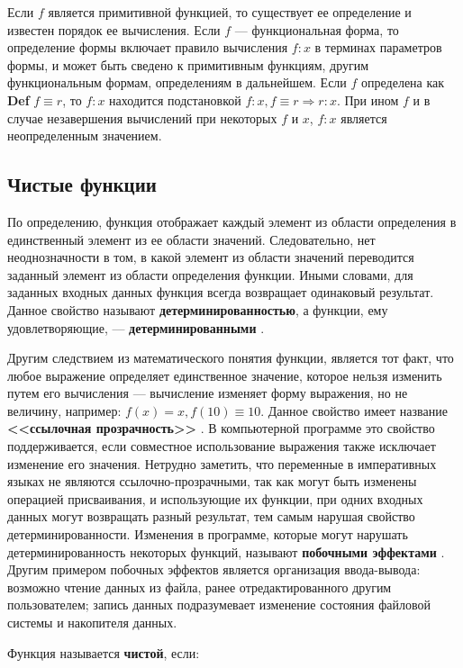 Если $f$ является примитивной функцией, то существует ее определение и известен
порядок ее вычисления. Если $f$ --- функциональная форма, то определение
формы включает правило вычисления $f:x$ в терминах параметров формы, и может
быть сведено к примитивным функциям, другим функциональным формам, определениям
в дальнейшем. Если $f$ определена как \textbf{Def} $f \equiv r$, то
$f:x$ находится подстановкой $f:x, f \equiv r \Rightarrow r:x$. При ином $f$
и в случае незавершения вычислений при некоторых $f$ и $x$, $f:x$ является
неопределенным значением.

\subsection{Чистые функции}\label{sec:ch1/sec3/subsec2}

По определению, функция отображает каждый элемент из области определения
в единственный элемент из ее области значений.
Следовательно, нет неоднозначности в том, в какой элемент
из области значений переводится заданный элемент из области
определения функции. Иными словами, для заданных входных данных
функция всегда возвращает одинаковый результат. Данное свойство
называют \textbf{детерминированностью}, а функции, ему удовлетворяющие, ---
\textbf{детерминированными} \cite[с.~12]{fp93}.

Другим следствием из математического понятия функции, является тот факт,
что любое выражение определяет единственное значение, которое нельзя
изменить путем его вычисления --- вычисление изменяет форму выражения, но не
величину, например: $f(x) = x, f(10) \equiv 10$. Данное свойство имеет
название \textbf{<<ссылочная прозрачность>>} \cite{sorengardsestoftreftransp}.
В компьютерной программе это свойство поддерживается, если совместное
использование выражения также исключает изменение его значения.
Нетрудно заметить, что переменные в императивных языках не являются
ссылочно-прозрачными, так как могут быть изменены операцией присваивания,
и использующие их функции, при одних входных данных могут возвращать
разный результат, тем самым нарушая свойство детерминированности.
Изменения в программе, которые могут нарушать детерминированность некоторых
функций, называют \textbf{побочными эффектами} \cite[с.~17]{fp93}.
Другим примером побочных эффектов является организация ввода-вывода:
возможно чтение данных из файла, ранее отредактированного другим пользователем;
запись данных подразумевает изменение состояния файловой системы и накопителя данных.

Функция называется \textbf{чистой}, если:

